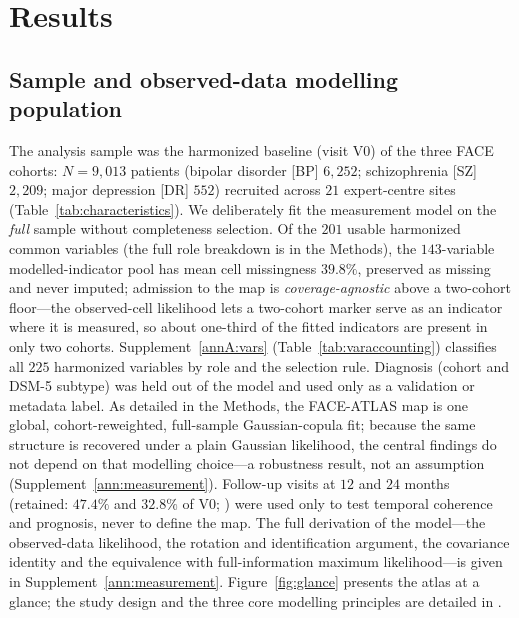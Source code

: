 \section{Results}

\subsection{Sample and observed-data modelling population}

The analysis sample was the harmonized baseline (visit V0) of the three FACE
cohorts: $N=9{,}013$ patients (bipolar disorder [BP] $6{,}252$; schizophrenia [SZ]
$2{,}209$; major depression [DR] $552$) recruited across $21$ expert-centre sites
(Table~\ref{tab:characteristics}).  We deliberately fit the measurement
model on the \emph{full} sample without completeness selection. Of the $201$ usable
harmonized common variables (the full role breakdown is in the Methods), the $143$-variable
modelled-indicator pool has mean cell missingness $39.8\%$, preserved as missing and never
imputed; admission to the map is \emph{coverage-agnostic} above a two-cohort floor---the
observed-cell likelihood lets a two-cohort marker serve as an indicator where it is measured,
so about one-third of the fitted indicators are present in only two cohorts.
Supplement~\ref{annA:vars} (Table~\ref{tab:varaccounting}) classifies all $225$ harmonized
variables by role and the selection rule. Diagnosis (cohort and DSM-5 subtype) was held out of the model and used only
as a validation or metadata label. As detailed in the Methods, the FACE-ATLAS map is one global,
cohort-reweighted, full-sample Gaussian-copula fit; because the same structure is recovered
under a plain Gaussian likelihood, the central findings do not depend on that modelling
choice---a robustness result, not an assumption (Supplement~\ref{ann:measurement}). Follow-up visits
at $12$ and $24$ months (retained: $47.4\%$ and $32.8\%$ of V0; )
were used only to test temporal coherence and prognosis, never to define the map. The
full derivation of the model---the observed-data likelihood, the rotation and identification
argument, the covariance identity and the equivalence with full-information maximum
likelihood---is given in Supplement~\ref{ann:measurement}. Figure~\ref{fig:glance} presents the atlas at a
glance; the study design and the three core modelling principles are detailed in
.

